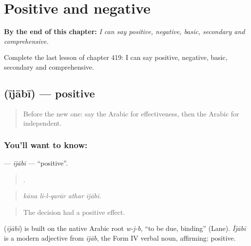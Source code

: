 
\chapter{Positive and negative}
\label{ch:ar-positive-and-negative}

\begin{chapteropening}
\textbf{By the end of this chapter:} \emph{I can say positive, negative, basic, secondary and comprehensive.}

Complete the last lesson of chapter 419: I can say positive, negative, basic, secondary and comprehensive.
\end{chapteropening}

\section[\texorpdfstring{\ar{إيجابي} (ījābī)}{إيجابي (ījābī)}]{ (ījābī) — positive}

\label{lesson:AR-C419-ijabi}



\begin{quote}
Before the new one: say the Arabic for effectiveness, then the Arabic for independent.
\end{quote}

\subsection*{You'll want to know: }
\textbf{} — \emph{ījābī} — \textquotedblleft{}positive\textquotedblright{}.

\begin{quote}
   .
\end{quote}

\begin{quote}
\emph{kāna li-l-qarār athar ījābī.}
\end{quote}

\begin{quote}
The decision had a positive effect.
\end{quote}

\begin{cousinweb}
\textbf{} (\emph{ījābī}) is built on the native Arabic root \emph{w-j-b}, \textquotedblleft{}to be due, binding\textquotedblright{} (Lane). \emph{Ījābī} is a modern adjective from \emph{ījāb}, the Form IV verbal noun, affirming: positive.
\end{cousinweb}

